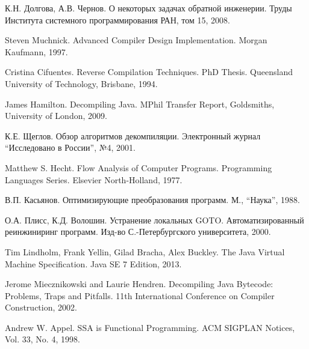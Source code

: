 \begin{thebibliography}{11}

К.Н. Долгова, А.В. Чернов. 
О некоторых задачах обратной инженерии. Труды Института системного программирования РАН, том 15, 2008.

Steven Muchnick. Advanced Compiler Design Implementation. Morgan Kaufmann, 1997.

Cristina Cifuentes. Reverse Compilation Techniques. PhD Thesis. Queensland University of Technology, Brisbane, 1994.

James Hamilton.
Decompiling Java. MPhil Transfer Report, Goldsmiths, University of London, 2009.

К.Е. Щеглов. Обзор алгоритмов декомпиляции. Электронный журнал ``Исследовано в России'', №4, 2001. 

Matthew S. Hecht. Flow Analysis of Computer Programs. Programming Languages Series. Elsevier North-Holland,
1977.

В.П. Касьянов. Оптимизирующие преобразования программ. М., ``Наука'', 1988.

О.А. Плисс, К.Д. Волошин.
Устранение локальных GOTO. Автоматизированный реинжиниринг программ.
Изд-во С.-Петербургского университета, 2000.

Tim Lindholm, Frank Yellin, Gilad Bracha, Alex Buckley.
The Java Virtual Machine Specification.
Java SE 7 Edition, 2013.

Jerome Miecznikowski and Laurie Hendren. 
Decompiling Java Bytecode: Problems, Traps and Pitfalls. 
11th International Conference on Compiler Construction, 2002.

Andrew W. Appel. SSA is Functional Programming. ACM SIGPLAN Notices, Vol. 33, No. 4, 1998.
\end{thebibliography}
